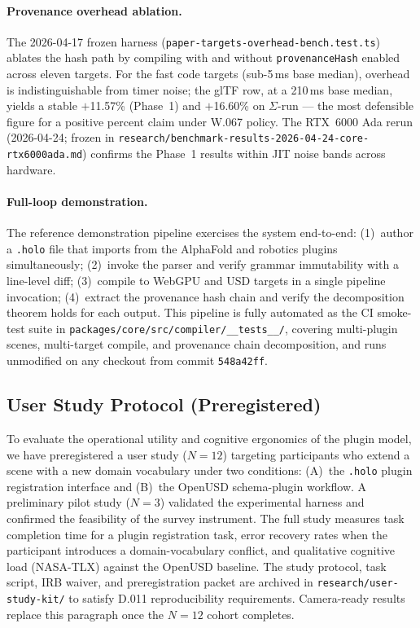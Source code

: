 \documentclass[sigconf,nonacm]{acmart}
\newcommand{\holo}{\texttt{.holo}}
\begin{document}
\paragraph{Provenance overhead ablation.}
The 2026-04-17 frozen harness
(\texttt{paper-targets-overhead-bench.test.ts}) ablates the hash
path by compiling with and without \texttt{provenanceHash} enabled
across eleven targets. For the fast code targets (sub-5\,ms base
median), overhead is indistinguishable from timer noise; the glTF
row, at a 210\,ms base median, yields a stable $+$11.57\% (Phase~1)
and $+$16.60\% on $\Sigma$-run --- the most defensible figure for a
positive percent claim under W.067 policy. The RTX~6000 Ada rerun
(2026-04-24; frozen in
\texttt{research/benchmark-results-2026-04-24-core-rtx6000ada.md})
confirms the Phase~1 results within JIT noise bands across hardware.

\paragraph{Full-loop demonstration.}
The reference demonstration pipeline exercises the system
end-to-end: (1)~author a \texttt{.holo} file that imports from the
AlphaFold and robotics plugins simultaneously; (2)~invoke the parser
and verify grammar immutability with a line-level diff;
(3)~compile to WebGPU and USD targets in a single pipeline invocation;
(4)~extract the provenance hash chain and verify the decomposition
theorem holds for each output. This pipeline is fully automated as
the CI smoke-test suite in
\texttt{packages/core/src/compiler/\_\_tests\_\_/}, covering
multi-plugin scenes, multi-target compile, and provenance chain
decomposition, and runs unmodified on any checkout from commit
\texttt{548a42ff}.

\subsection{User Study Protocol (Preregistered)}
\label{sec:user-study}

To evaluate the operational utility and cognitive ergonomics of the
plugin model, we have preregistered a user study ($N=12$) targeting
participants who extend a scene with a new domain vocabulary under
two conditions: (A)~the \holo{} plugin registration interface and
(B)~the OpenUSD schema-plugin workflow. A preliminary pilot study
($N=3$) validated the experimental harness and confirmed the
feasibility of the survey instrument. The full study measures task
completion time for a plugin registration task, error recovery rates
when the participant introduces a domain-vocabulary conflict, and
qualitative cognitive load (NASA-TLX) against the OpenUSD baseline.
The study protocol, task script, IRB waiver, and preregistration
packet are archived in \texttt{research/user-study-kit/} to satisfy
D.011 reproducibility requirements. Camera-ready results replace
this paragraph once the $N=12$ cohort completes.
\end{document}
